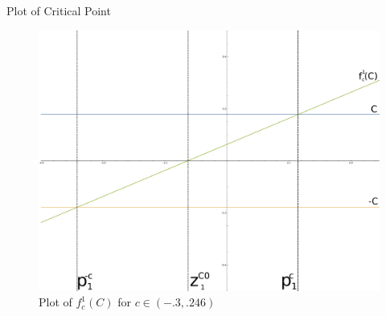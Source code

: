 \documentclass{beamer}
\newcommand{\<}{\left\langle}
\renewcommand{\>}{\right\rangle} %
\renewcommand{\*}{\cdot} %
\begin{document}
\begin{frame}{Plot of Critical Point}
	\begin{figure}
		\centering
		\includegraphics[width=.8\textwidth]{./img/1it}
		\caption{Plot of $f^1_c (C)$ for $c \in (-.3,.246)$}
	\end{figure}
\end{frame}
\end{document}
